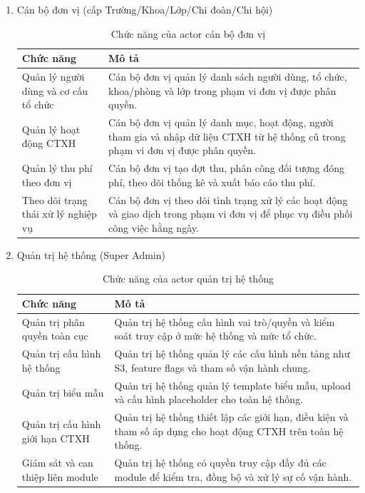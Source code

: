 \begin{enumerate}
	\item Cán bộ đơn vị (cấp Trường/Khoa/Lớp/Chi đoàn/Chi hội)
	\begin{table}[H]
	\centering
	\begin{tabular}{|p{5cm}|p{10cm}|}
		\hline
		Chức năng & Mô tả  \\
		\hline
		Quản lý người dùng và cơ cấu tổ chức & Cán bộ đơn vị quản lý danh sách người dùng, tổ chức, khoa/phòng và lớp trong phạm vi đơn vị được phân quyền. \\
		\hline
		Quản lý hoạt động CTXH & Cán bộ đơn vị quản lý danh mục, hoạt động, người tham gia và nhập dữ liệu CTXH từ hệ thống cũ trong phạm vi đơn vị được phân quyền. \\
		\hline
		Quản lý thu phí theo đơn vị & Cán bộ đơn vị tạo đợt thu, phân công đối tượng đóng phí, theo dõi thống kê và xuất báo cáo thu phí. \\
		\hline
		Theo dõi trạng thái xử lý nghiệp vụ & Cán bộ đơn vị theo dõi tình trạng xử lý các hoạt động và giao dịch trong phạm vi đơn vị để phục vụ điều phối công việc hằng ngày. \\
		\hline
	\end{tabular}
	\caption{Chức năng của actor cán bộ đơn vị}
	\end{table}

	\item Quản trị hệ thống (Super Admin)
	\begin{table}[H]
	\centering
	\begin{tabular}{|p{5cm}|p{10cm}|}
		\hline
		Chức năng & Mô tả  \\
		\hline
		Quản trị phân quyền toàn cục & Quản trị hệ thống cấu hình vai trò/quyền và kiểm soát truy cập ở mức hệ thống và mức tổ chức. \\
		\hline
		Quản trị cấu hình hệ thống & Quản trị hệ thống quản lý các cấu hình nền tảng như S3, feature flags và tham số vận hành chung. \\
		\hline
		Quản trị biểu mẫu & Quản trị hệ thống quản lý template biểu mẫu, upload và cấu hình placeholder cho toàn hệ thống. \\
		\hline
		Quản trị cấu hình giới hạn CTXH & Quản trị hệ thống thiết lập các giới hạn, điều kiện và tham số áp dụng cho hoạt động CTXH trên toàn hệ thống. \\
		\hline
		Giám sát và can thiệp liên module & Quản trị hệ thống có quyền truy cập đầy đủ các module để kiểm tra, đồng bộ và xử lý sự cố vận hành. \\
		\hline
	\end{tabular}
	\caption{Chức năng của actor quản trị hệ thống}
	\end{table}


\end{enumerate}
